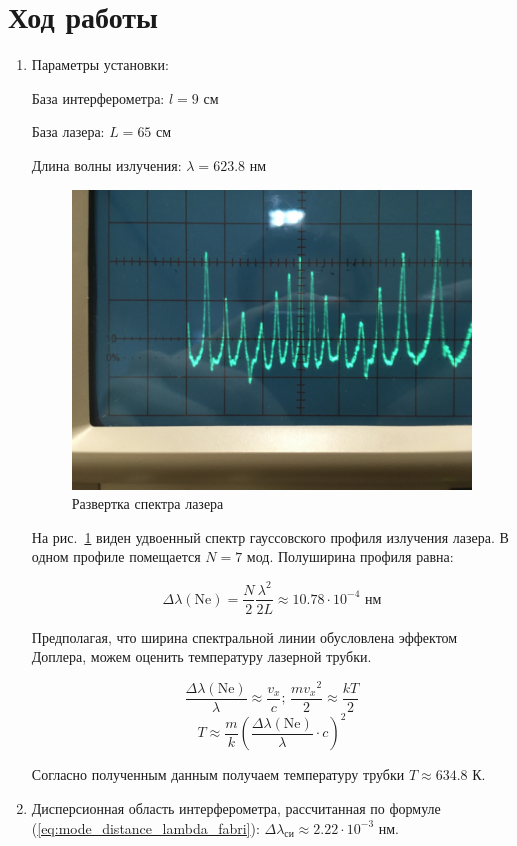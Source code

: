 \section{Ход работы}
\begin{enumerate}

\item Параметры установки:

    База интерферометра: $l = 9$ см
    
    База лазера:  $L = 65$ см

    Длина волны излучения: $\lambda = 623.8$ нм

\begin{figure}[h]
    \center\includegraphics[width=0.5\linewidth]{spectrum_1.jpg}
    \caption{Развертка спектра лазера}\label{fig:spectrum_1}
\end{figure}

На рис.~\ref{fig:spectrum_1} виден удвоенный спектр гауссовского профиля излучения лазера. В одном профиле помещается $N=7$ мод. Полуширина профиля равна:


\begin{equation}
    \Delta\lambda(\text{Ne})=\frac{N}{2} \frac{\lambda^2}{2L} \approx
    10.78 \cdot 10^{-4}\text{ нм}
\end{equation}

Предполагая, что ширина спектральной линии обусловлена эффектом Доплера, можем оценить температуру лазерной трубки.


    $$\frac{\Delta\lambda(\text{Ne})}{\lambda}\approx\frac{v_x}{c}
    \text{;\ \ \ } \frac{m{v_x}^2}{2} \approx \frac{kT}{2}$$
\begin{equation}   
    T \approx \frac{m}{k}\left( \frac{\Delta\lambda(\text{Ne})}{\lambda}\cdot c\right)^2
\end{equation}

Согласно полученным данным получаем температуру трубки $T\approx 634.8$ К.

\item
Дисперсионная область интерферометра, рассчитанная по формуле (\ref{eq:mode_distance_lambda_fabri}): $\Delta\lambda_{\text{си}} \approx 2.22 \cdot 10^{-3} \text{ нм}$. 


\end{enumerate}

